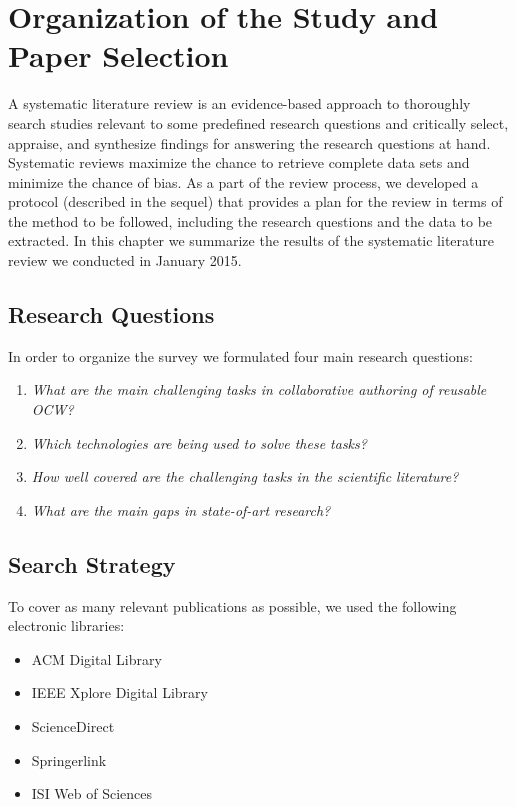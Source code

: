 \documentclass[ngerman,UKenglish,table]{scrbook}
\begin{document}
\section{Organization of the Study and Paper Selection}
\label{section:collecting_studies}


A systematic literature review is an evidence-based approach to thoroughly search studies relevant to some predefined research questions and critically select, appraise, and synthesize findings for answering the research questions at hand.
Systematic reviews maximize the chance to retrieve complete data sets and minimize the chance of bias.
As a part of the review process, we developed a protocol (described in the sequel) that provides a plan for the review in terms of the method to be followed, including the research questions and the data to be extracted.
In this chapter we summarize the results of the systematic literature review we conducted in January 2015. 

\subsection{Research Questions}
\label{sec:researchQuestion}

In order to organize the survey we formulated four main research questions:
\begin{enumerate}

\item \emph{What are the main challenging tasks in collaborative authoring of reusable OCW?}
\item \emph{Which technologies are being used to solve these tasks?}
\item \emph{How well covered are the challenging tasks in the scientific literature?}
\item \emph{What are the main gaps in state-of-art research?}

\end{enumerate}


\subsection{Search Strategy}
\label{sec:searchStartegy}

To cover as many relevant publications as possible, we used the following electronic libraries:

\begin{itemize}
    \setlength{\itemsep}{0pt}
	\item ACM Digital Library
	\item IEEE Xplore Digital Library
	\item ScienceDirect
	\item Springerlink
	\item ISI Web of Sciences
\end{itemize}
\end{document}
